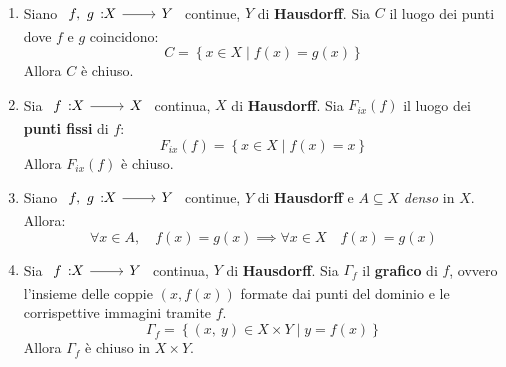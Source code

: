 \begin{proposition}~{}
\begin{enumerate}
\item Siano $\funz{f,\ g}{X}{Y}$ continue, $Y$ di \textbf{Hausdorff}. Sia $C$ il luogo dei punti dove $f$ e $g$ coincidono:
\begin{equation}
C=\left\{x\in X\mid f\left(x\right)=g\left(x\right)\right\}
\end{equation}
Allora $C$ è chiuso.
\item  Sia $\funz{f}{X}{X}$ continua, $X$ di \textbf{Hausdorff}.  Sia $F_{ix}\left(f\right)$ il luogo dei \textbf{punti fissi} di $f$:
\begin{equation}
F_{ix}\left(f\right)=\left\{x\in X\mid f\left(x\right)=x\right\}
\end{equation}
Allora $F_{ix}\left(f\right)$ è chiuso.
\item Siano $\funz{f,\ g}{X}{Y}$ continue, $Y$ di \textbf{Hausdorff} e $A\subseteq X$ \textit{denso} in $X$. Allora:
\begin{equation}
\forall x\in A,\quad f\left(x\right)=g\left(x\right)\implies \forall x\in X\quad f\left(x\right)=g\left(x\right)
\end{equation}
\item Sia $\funz{f}{X}{Y}$ continua, $Y$ di \textbf{Hausdorff}. Sia $\Gamma_f$ il \textbf{grafico} di $f$, ovvero l'insieme delle coppie $(x,f\left(x\right))$ formate dai punti del dominio e le corrispettive immagini tramite $f$.
\begin{equation}
\Gamma_f=\left\{\left(x,\ y\right)\in X\times Y\mid y=f\left(x\right)\right\}
\end{equation}
Allora $\Gamma_f$ è chiuso in $X\times Y$.
\end{enumerate}
\vspace{-3mm}
\end{proposition}
